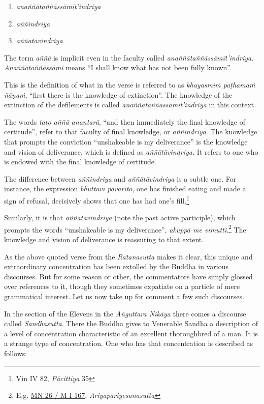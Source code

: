 \begin{enumerate}
\def\labelenumi{\arabic{enumi}.}
\tightlist
\item
  \emph{anaññātaññāssāmīt'indriya}
\item
  \emph{aññindriya}
\item
  \emph{aññātāvindriya}
\end{enumerate}

The term \emph{aññā} is implicit even in the faculty called \emph{anaññātaññāssāmīt'indriya}. \emph{Anaññātaññāssāmi} means ``I shall know what has not been fully known''.

This is the definition of what in the verse is referred to as \emph{khayasmiṁ paṭhamaṁ ñāṇaṁ}, ``first there is the knowledge of extinction''. The knowledge of the extinction of the defilements is called \emph{anaññātaññāssāmīt'indriya} in this context.

The words \emph{tato aññā anantarā}, ``and then immediately the final knowledge of certitude'', refer to that faculty of final knowledge, or \emph{aññindriya}. The knowledge that prompts the conviction ``unshakeable is my deliverance'' is the knowledge and vision of deliverance, which is defined as \emph{aññātāvindriya.} It refers to one who is endowed with the final knowledge of certitude.

The difference between \emph{aññindriya} and \emph{aññātāvindriya} is a subtle one. For instance, the expression \emph{bhuttāvī pavārito}, one has finished eating and made a sign of refusal, decisively shows that one has had one's fill.\footnote{Vin IV 82, \emph{Pācittiya} 35}

Similarly, it is that \emph{aññātāvindriya} (note the past active participle), which prompts the words ``unshakeable is my deliverance'', \emph{akuppā me vimutti}.\footnote{E.g. \href{https://suttacentral.net/mn26/pli/ms}{MN 26 / M I 167}, \emph{Ariyapariyesanasutta}} The knowledge and vision of deliverance is reassuring to that extent.

As the above quoted verse from the \emph{Ratanasutta} makes it clear, this unique and extraordinary concentration has been extolled by the Buddha in various discourses. But for some reason or other, the commentators have simply glossed over references to it, though they sometimes expatiate on a particle of mere grammatical interest. Let us now take up for comment a few such discourses.

In the section of the Elevens in the \emph{Aṅguttara Nikāya} there comes a discourse called \emph{Sandhasutta}. There the Buddha gives to Venerable Sandha a description of a level of concentration characteristic of an excellent thoroughbred of a man. It is a strange type of concentration. One who has that concentration is described as follows:

